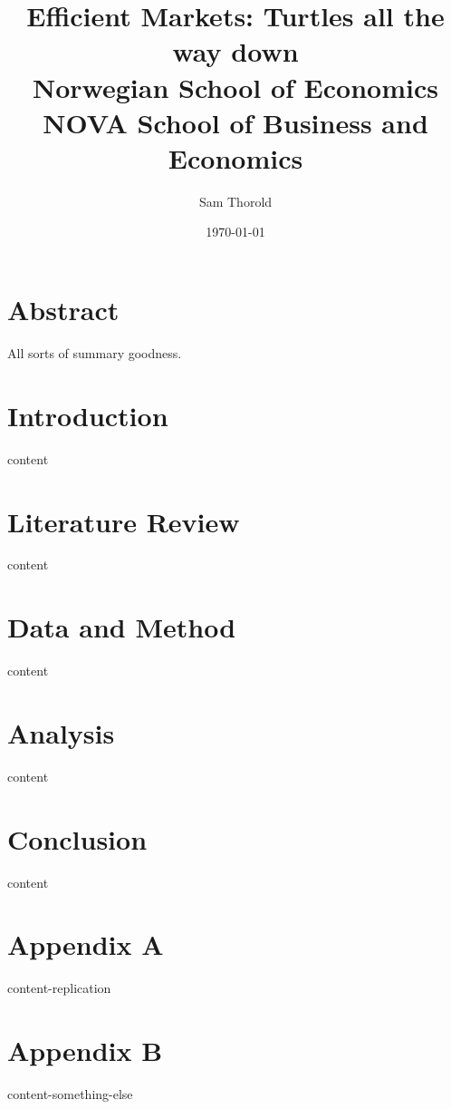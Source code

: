 \documentclass[12pt]{report}
\title{
  {Efficient Markets: Turtles all the way down}\\
  {\large Norwegian School of Economics}\\
  {\large NOVA School of Business and Economics}
}
\author{Sam Thorold}
\date{\today}
\begin{document}
\maketitle

\chapter*{Abstract}

All sorts of summary goodness.

\tableofcontents

\chapter{Introduction} \label{ch:Intro}
{content}

\chapter{Literature Review} \label{ch:LitRev}
{content}

\chapter{Data and Method} \label{ch:DataMethod}
{content}

\chapter{Analysis} \label{ch:Analysis}
{content}

\chapter{Conclusion} \label{ch:Conclusion}
{content}

\appendix

\chapter{Appendix A} \label{ch:AppendixRepl}
{content-replication}

\chapter{Appendix B} \label{ch:AppendixB}
{content-something-else}

\printbibliography
\end{document}
